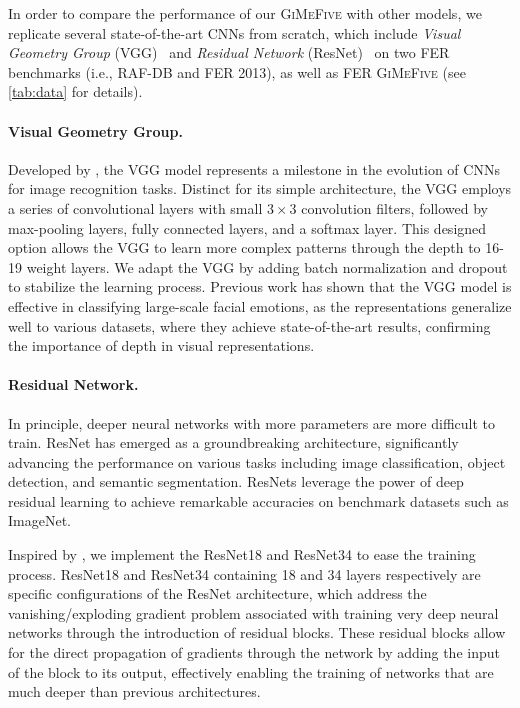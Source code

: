 In order to compare the performance of our \textsc{GiMeFive} with other models, 
we replicate several state-of-the-art CNNs from scratch, 
which include \textit{Visual Geometry Group} (VGG)~\cite{SimonyanZ14a} and 
\textit{Residual Network} (ResNet)~\cite{HeZRS16} on two FER benchmarks (i.e., RAF-DB and FER 2013), 
as well as FER \textsc{GiMeFive} (see \cref{tab:data} for details). 

\paragraph{Visual Geometry Group.}
Developed by \citet{SimonyanZ14a}, 
the VGG model represents a milestone in the evolution of CNNs for image recognition tasks. 
Distinct for its simple architecture, 
the VGG employs a series of convolutional layers with small $3 \times 3$ convolution filters, 
followed by max-pooling layers, fully connected layers, and a softmax layer. 
This designed option allows the VGG to learn more complex patterns through the depth to 16-19 weight layers. 
We adapt the VGG by adding batch normalization and dropout to stabilize the learning process. 
Previous work has shown that the VGG model is effective in classifying large-scale facial emotions, 
as the representations generalize well to various datasets, 
where they achieve state-of-the-art results, 
confirming the importance of depth in visual representations. 

\paragraph{Residual Network.}
In principle, 
deeper neural networks with more parameters are more difficult to train. 
ResNet has emerged as a groundbreaking architecture, 
significantly advancing the performance on various tasks including image classification, 
object detection, and semantic segmentation. 
ResNets leverage the power of deep residual learning to achieve remarkable accuracies on benchmark datasets such as ImageNet. 

Inspired by \citet{HeZRS16}, 
we implement the ResNet18 and ResNet34 to ease the training process. 
ResNet18 and ResNet34 containing 18 and 34 layers respectively are specific configurations of the ResNet architecture, 
which address the vanishing/exploding gradient problem associated with training very deep neural networks through the introduction of residual blocks. 
These residual blocks allow for the direct propagation of gradients through the network by adding the input of the block to its output, 
effectively enabling the training of networks that are much deeper than previous architectures. 

